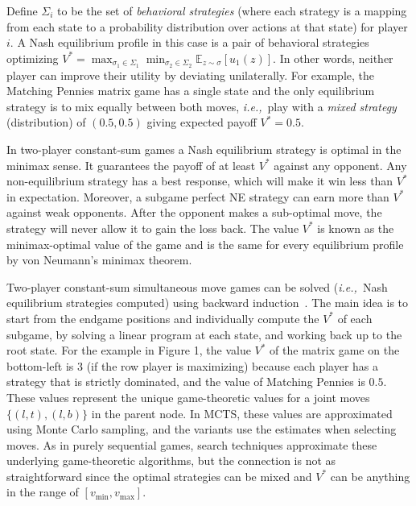 \documentclass[conference]{IEEEtran}
\newcommand{\bE}{\mathbb{E}}
\newcommand{\cA}{\mathcal{A}}
\newcommand{\cS}{\mathcal{S}}
\newcommand{\ie}{{\it i.e.,}~}
\begin{document}
Define $\Sigma_i$ to be the set of {\it behavioral strategies} (where each strategy is a mapping from each state to 
a probability distribution over actions at that state) for player $i$. A Nash equilibrium profile in this case is a pair of 
behavioral strategies optimizing $V^* = \max_{\sigma_1 \in \Sigma_1} \min_{\sigma_2 \in \Sigma_2} \bE_{z \sim \sigma}[u_1(z)].$
In other words, neither player can improve their utility by deviating unilaterally. 
For example, the Matching Pennies matrix game has a single state and the only equilibrium strategy is to mix equally between both moves, \ie play with a {\it mixed strategy} (distribution) of $(0.5, 0.5)$ giving expected payoff $V^* = 0.5$. 

In two-player constant-sum games a Nash equilibrium strategy is optimal in the minimax sense. It guarantees the payoff of at least $V^*$ against any opponent. Any 
non-equilibrium strategy has a best response, which will make it win less than $V^*$ in expectation. Moreover, a subgame perfect NE strategy can earn more 
than $V^*$ against weak opponents. After the opponent makes a sub-optimal move, the strategy will never allow it to gain the loss back. 
The value $V^*$ is known as the minimax-optimal value of the game and is the same for every equilibrium profile by von Neumann's minimax theorem.

Two-player constant-sum simultaneous move games can be solved (\ie Nash equilibrium strategies computed) using backward 
induction~\cite{Ross71Goofspiel,Buro03OshiZumo,Rhoads12Computer}. The main idea is to start from the 
endgame positions and individually compute the $V^*$ of each subgame, by solving a linear program at each state, and working back up to the root state.
For the example in Figure 1, the value $V^*$ of the matrix game on the bottom-left is $3$ (if the row player is maximizing) because each player has a 
strategy that is strictly dominated, and the 
value of Matching Pennies is $0.5$. These values represent the unique game-theoretic values for a joint moves $\{ (l,t), (l,b) \}$ in the parent node.
In MCTS, these values are approximated using Monte Carlo sampling, and the variants use the estimates when selecting moves.
As in purely sequential games, search techniques approximate these underlying game-theoretic algorithms, but  
the connection is not as straightforward since the optimal strategies can be mixed and $V^*$ can be anything 
in the range of $[v_{\min}, v_{\max}]$.
\end{document}
